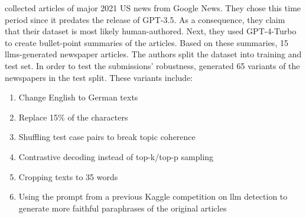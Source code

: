 \citet{ayele_overview_nodate} collected articles of major 2021 US news from Google News.
They chose this time period since it predates the release of GPT-3.5.
As a consequence, they claim that their dataset is most likely human-authored.
Next, they used GPT-4-Turbo to create bullet-point summaries of the articles. 
Based on these summaries, 15 \acp{llm}-generated newspaper articles.
The authors split the dataset into training and test set.
In order to test the submissions' robustness, \citet{ayele_overview_nodate} generated 65 variants of the newspapers in the test split.
These variants include:
\begin{enumerate}
    \item Change English to German texts
    \item Replace 15\% of the characters
    \item Shuffling test case pairs to break topic coherence 
    \item Contrastive decoding instead of top-k/top-p sampling
    \item Cropping texts to 35 words
    \item Using the prompt from a previous Kaggle competition on \ac{llm} detection to generate more faithful paraphrases of the original articles
\end{enumerate}